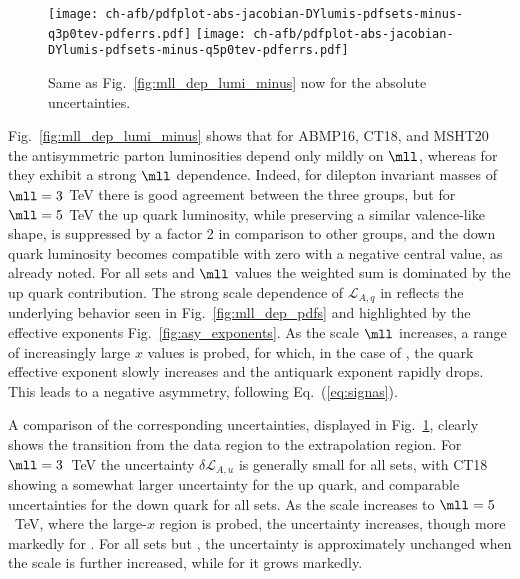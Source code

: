 \begin{figure}[!t]
 \centering
 \texttt{[image: ch-afb/pdfplot-abs-jacobian-DYlumis-pdfsets-minus-q3p0tev-pdferrs.pdf]}
 \texttt{[image: ch-afb/pdfplot-abs-jacobian-DYlumis-pdfsets-minus-q5p0tev-pdferrs.pdf]}
 \caption{Same as Fig.~\ref{fig:mll_dep_lumi_minus} now for the absolute \pdf uncertainties.
    }    
 \label{fig:mll_dep_lumi_minus_pdferrs}
\end{figure}

Fig.~\ref{fig:mll_dep_lumi_minus} shows that for ABMP16, CT18, and
MSHT20 the antisymmetric
parton luminosities depend only mildly on $\mll$, whereas for 
they exhibit a strong $\mll$ dependence.
%
Indeed, for dilepton invariant masses of $\mll=3$ TeV there is good
agreement between the three groups, but
for $\mll=5$ TeV the  up quark luminosity, while preserving a
similar valence-like shape, is suppressed
by a factor 2 in comparison  to other groups, and the down quark luminosity becomes compatible with zero with a negative
central value,  as already noted. 
%
For all \pdf sets and  $\mll$ values the weighted sum is dominated by the up quark contribution.
The strong scale dependence of $\mathcal{L}_{A,q}$ in 
reflects the underlying \pdf behavior seen in  Fig.~\ref{fig:mll_dep_pdfs}
and highlighted by the effective exponents Fig.~\ref{fig:asy_exponents}.
%
As the scale $\mll$ increases, a range of increasingly large $x$ values is probed,
for which, in the case of
, the quark effective exponent slowly increases and the
antiquark exponent rapidly drops.
%
This leads to a negative asymmetry, 
following  Eq.~(\ref{eq:signas}). 

A comparison of the corresponding \pdf uncertainties, displayed in
Fig.~\ref{fig:mll_dep_lumi_minus_pdferrs}, clearly shows the transition
from the data region to the extrapolation region.
%
For
$\mll=3$~TeV the uncertainty $\delta \mathcal{L}_{A,u}$ is generally
small for all sets, with CT18
showing a somewhat larger uncertainty for the up quark, and comparable
uncertainties for the down quark for all \pdf sets.
%
As the scale  increases to $\mll=5$~TeV, where the large-$x$ region is
probed,  the uncertainty 
increases, though more markedly for .
%
For all \pdf sets but
, the
uncertainty is approximately unchanged when the scale is further increased,
while for  it grows markedly.

